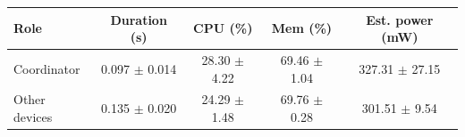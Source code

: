 \begin{tabular}{lcccc}
\hline
\textbf{Role} & \textbf{Duration (s)} & \textbf{CPU (\%)} & \textbf{Mem (\%)} & \textbf{Est. power (mW)} \\
\hline
Coordinator & 0.097 $\pm$ 0.014 & 28.30 $\pm$ 4.22 & 69.46 $\pm$ 1.04 & 327.31 $\pm$ 27.15 \\
Other devices & 0.135 $\pm$ 0.020 & 24.29 $\pm$ 1.48 & 69.76 $\pm$ 0.28 & 301.51 $\pm$ 9.54 \\
\hline
\end{tabular}
